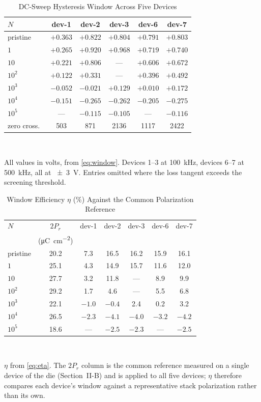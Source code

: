 \documentclass[journal]{IEEEtran}
\newcommand{\rev}[1]{{\color{blue}#1}}      %
\newcommand{\Prem}{P_r}
\newcommand{\ucm}{\micro\coulomb\per\centi\meter\squared}
\begin{document}
\begin{table}[!t]
\caption{\rev{DC-Sweep Hysteresis Window Across Five Devices}}
\label{tab:window}\centering\footnotesize\setlength{\tabcolsep}{4pt}
\begin{tabular}{lccccc}
\toprule
$N$ & dev-1 & dev-2 & dev-3 & dev-6 & dev-7\\
\midrule
pristine & $+0.363$ & $+0.822$ & $+0.804$ & $+0.791$ & $+0.803$\\
$1$      & $+0.265$ & $+0.920$ & $+0.968$ & $+0.719$ & $+0.740$\\
$10$     & $+0.221$ & $+0.806$ & ---      & $+0.606$ & $+0.672$\\
$10^2$   & $+0.122$ & $+0.331$ & ---      & $+0.396$ & $+0.492$\\
$10^3$   & $-0.052$ & $-0.021$ & $+0.129$ & $+0.010$ & $+0.172$\\
$10^4$   & $-0.151$ & $-0.265$ & $-0.262$ & $-0.205$ & $-0.275$\\
$10^5$   & ---      & $-0.115$ & $-0.105$ & ---      & $-0.116$\\
\midrule
zero cross.\ & 503 & 871 & 2136 & 1117 & 2422\\
\bottomrule
\end{tabular}\\[2pt]
\parbox{\columnwidth}{\scriptsize All values in volts, from
\eqref{eq:window}. Devices 1--3 at \SI{100}{\kilo\hertz}, devices 6--7
at \SI{500}{\kilo\hertz}, all at \SI{\pm3}{\volt}. Entries omitted where
the loss tangent exceeds the screening threshold.}
\end{table}

\begin{table}[!t]
\caption{\rev{Window Efficiency $\eta$ (\%) Against the Common
Polarization Reference}}
\label{tab:eta}\centering\footnotesize\setlength{\tabcolsep}{4pt}
\begin{tabular}{lcccccc}
\toprule
$N$ & $2\Prem$ & dev-1 & dev-2 & dev-3 & dev-6 & dev-7\\
    & (\si{\ucm}) & & & & &\\
\midrule
pristine & 20.2 & 7.3 & 16.5 & 16.2 & 15.9 & 16.1\\
$1$      & 25.1 & 4.3 & 14.9 & 15.7 & 11.6 & 12.0\\
$10$     & 27.7 & 3.2 & 11.8 & ---  & 8.9  & 9.9\\
$10^2$   & 29.2 & 1.7 & 4.6  & ---  & 5.5  & 6.8\\
$10^3$   & 22.1 & $-1.0$ & $-0.4$ & 2.4 & 0.2 & 3.2\\
$10^4$   & 26.5 & $-2.3$ & $-4.1$ & $-4.0$ & $-3.2$ & $-4.2$\\
$10^5$   & 18.6 & ---    & $-2.5$ & $-2.3$ & ---    & $-2.5$\\
\bottomrule
\end{tabular}\\[2pt]
\parbox{\columnwidth}{\scriptsize $\eta$ from \eqref{eq:eta}. The
$2\Prem$ column is the common reference measured on a single device of
the die (Section~II-B) and is applied to all five devices; $\eta$
therefore compares each device's window against a representative stack
polarization rather than its own.}
\end{table}
\end{document}
